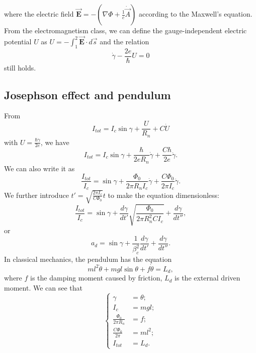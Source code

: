 where the electric field $\overrightarrow{\bm{E}}=-(\nabla\Phi+\frac{1}{c}\dot{\overrightarrow{A}})$
according to the Maxwell's equation. From the electromagnetism class,
we can define the gauge-independent electric potential $U$ as $U=-\int_{1}^{2}\overrightarrow{\bm{E}}\cdot d\overrightarrow{s}$
and the relation
\begin{equation}
\dot{\gamma}-\frac{2e}{\hbar}U=0
\end{equation}
still holds.

\subsection{Josephson effect and pendulum}
From
\begin{equation}
I_{tot}=I_{c}\sin\gamma+\frac{U}{R_{n}}+C\dot{U}
\end{equation}
with $U=\frac{\hbar\dot{\gamma}}{2e}$, we have 
\begin{equation}
I_{tot}=I_{c}\sin\gamma+\frac{\hbar}{2eR_{n}}\dot{\gamma}+\frac{C\hbar}{2e}\ddot{\gamma}.
\end{equation}
We can also write it as 
\begin{equation}
\frac{I_{tot}}{I_{c}}=\sin\gamma+\frac{\Phi_{0}}{2\pi R_{n}I_{c}}\dot{\gamma}+\frac{C\Phi_{0}}{2\pi I_{c}}\ddot{\gamma}.
\end{equation}
We further introduce $t'=\sqrt{\frac{2\pi I_{c}}{C\Phi_{0}}}t$ to
make the equation dimensionless:
\begin{equation}
\frac{I_{tot}}{I_{c}}=\sin\gamma+\frac{d\gamma}{dt'}\sqrt{\frac{\Phi_{0}}{2\pi R_{n}^{2}CI_{c}}}+\frac{d\gamma}{dt''},
\end{equation}
or 
\begin{equation}
a_{d}=\sin\gamma+\frac{1}{\beta_{c}^{2}}\frac{d\gamma}{dt'}+\frac{d\gamma}{dt''}.
\end{equation}
In classical mechanics, the pendulum has the equation
\begin{equation}
ml^{2}\ddot{\theta}+mgl\sin\theta+f\dot{\theta}=L_{d},
\end{equation}
where $f$ is the damping moment caused by friction, $L_{d}$ is the
external driven moment. We can see that 
\begin{equation}
\begin{cases}
\gamma & =\theta;\\
I_{c} & =mgl;\\
\frac{\Phi_{0}}{2\pi R_{n}} & =f;\\
\frac{C\Phi_{0}}{2\pi} & =ml^{2};\\
I_{tot} & =L_{d}.
\end{cases}
\end{equation}


